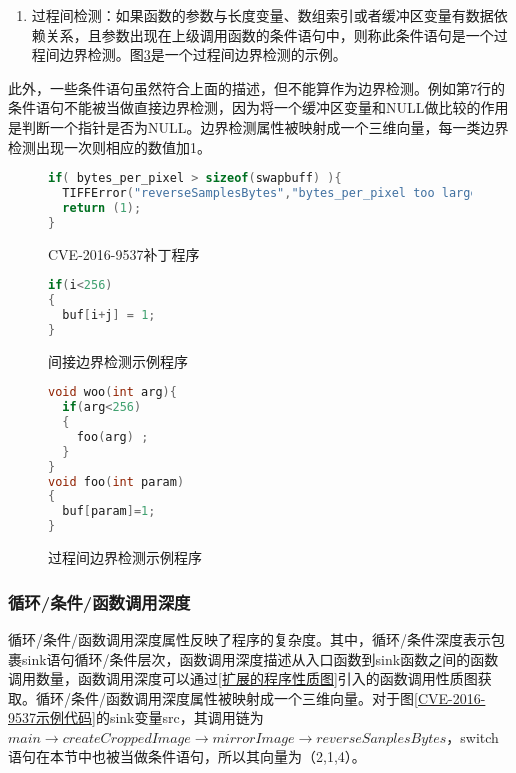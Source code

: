 {\begin{enumerate}[1]
\item 过程间检测：如果函数的参数与长度变量、数组索引或者缓冲区变量有数据依赖关系，且参数出现在上级调用函数的条件语句中，则称此条件语句是一个过程间边界检测。图\ref{过程间边界检测示例程序}是一个过程间边界检测的示例。
\end{enumerate}

此外，一些条件语句虽然符合上面的描述，但不能算作为边界检测。例如第7行的条件语句不能被当做直接边界检测，因为将一个缓冲区变量和NULL做比较的作用是判断一个指针是否为NULL。边界检测属性被映射成一个三维向量，每一类边界检测出现一次则相应的数值加1。

\begin{figure}[h]
\begin{lstlisting}[language=C]
if( bytes_per_pixel > sizeof(swapbuff) ){
  TIFFError("reverseSamplesBytes","bytes_per_pixel too large");
  return (1);
}

\end{lstlisting}

\caption{CVE-2016-9537补丁程序}
\label{CVE-2016-9537补丁程序}
\end{figure}


\begin{figure}[h]
\begin{lstlisting}[language=C]
if(i<256)
{
  buf[i+j] = 1;
}
\end{lstlisting}

\caption{间接边界检测示例程序}
\label{间接边界检测示例程序}
\end{figure}


\begin{figure}[h]
\begin{lstlisting}[language=C,caption=过程间边界检测示例程序,label=过程间边界检测示例程序]
void woo(int arg){
  if(arg<256)
  {
    foo(arg) ;
  }
}
void foo(int param)
{
  buf[param]=1;
}
\end{lstlisting}

\caption{过程间边界检测示例程序}
\label{过程间边界检测示例程序}
\end{figure}



\subsubsection{循环/条件/函数调用深度}

循环/条件/函数调用深度属性反映了程序的复杂度。其中，循环/条件深度表示包裹sink语句循环/条件层次，函数调用深度描述从入口函数到sink函数之间的函数调用数量，函数调用深度可以通过\ref{扩展的程序性质图}引入的函数调用性质图获取。循环/条件/函数调用深度属性被映射成一个三维向量。对于图\ref{CVE-2016-9537示例代码}的sink变量src，其调用链为$main \rightarrow createCroppedImage \rightarrow mirrorImage \rightarrow reverseSanplesBytes$，switch语句在本节中也被当做条件语句，所以其向量为（2,1,4）。

}
